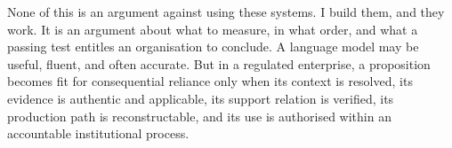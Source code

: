 None of this is an argument against using these systems. I build them, and they
work. It is an argument about what to measure, in what order, and what a passing
test entitles an organisation to conclude. A language model may be useful, fluent,
and often accurate. But in a regulated enterprise, a proposition becomes fit for
consequential reliance only when its context is resolved, its evidence is authentic
and applicable, its support relation is verified, its production path is
reconstructable, and its use is authorised within an accountable institutional
process.
